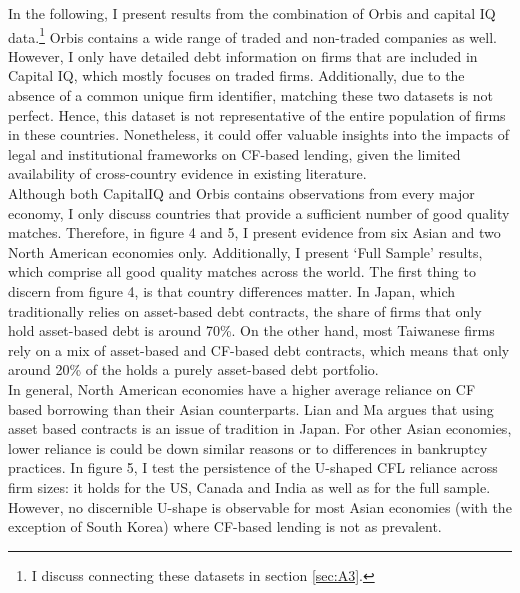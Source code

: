 \documentclass[12pt]{article}
\begin{document}
In the following, I present results from the combination of Orbis and capital IQ data.\footnote{I discuss connecting these datasets in section \ref{sec:A3}.} Orbis contains a wide range of traded and non-traded companies as well. However, I only have detailed debt information on firms that are included in Capital IQ, which mostly focuses on traded firms. Additionally, due to the absence of a common unique firm identifier, matching these two datasets is not perfect. Hence, this dataset is not representative of the entire population of firms in these countries. Nonetheless, it could offer valuable insights into the impacts of legal and institutional frameworks on CF-based lending, given the limited availability of cross-country evidence in existing literature. \vspace{3mm} \\
Although both CapitalIQ and Orbis contains observations from every major economy, I only discuss countries that provide a sufficient number of good quality matches. Therefore, in figure 4 and 5, I present evidence from six Asian and two North American economies only. Additionally, I present `Full Sample' results, which comprise all good quality matches across the world. The first thing to discern from figure 4, is that country differences matter. In Japan, which traditionally relies on asset-based debt contracts, the share of firms that only hold asset-based debt is around 70\%. On the other hand, most Taiwanese firms rely on a mix of asset-based and CF-based debt contracts, which means that only around 20\% of the holds a purely asset-based debt portfolio. \vspace{3mm} \\
In general, North American economies have a higher average reliance on CF based borrowing than their Asian counterparts. Lian and Ma argues that using asset based contracts is an issue of tradition in Japan. For other Asian economies, lower reliance is could be down similar reasons or to differences in bankruptcy practices. In figure 5, I test the persistence of the U-shaped CFL reliance across firm sizes: it holds for the US, Canada and India as well as for the full sample. However, no discernible U-shape is observable for most Asian economies (with the exception of South Korea) where CF-based lending is not as prevalent.
\end{document}
